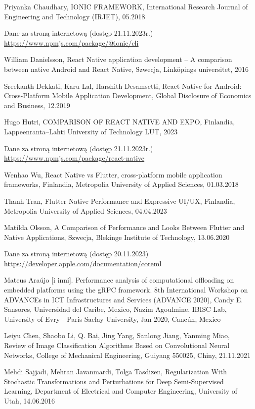 \documentclass[12pt, a4paper, twoside, openany]{book}
\begin{document}
{\begin{enumerate}[label={[}\arabic*{]}]
    \item Priyanka Chaudhary, IONIC FRAMEWORK, International Research Journal of Engineering and Technology (IRJET), 05.2018
    \item Dane za stroną internetową (dostęp 21.11.2023r.) \url{https://www.npmjs.com/package/@ionic/cli}
    \item William Danielsson, React Native application development – A comparison between native Android and React Native, Szwecja, Linköpings universitet, 2016
    \item Sreekanth Dekkati, Karu Lal, Harshith Desamsetti, React Native for Android: Cross-Platform Mobile Application Development, Global Disclosure of Economics and Business, 12.2019
    \item Hugo Hutri, COMPARISON OF REACT NATIVE AND EXPO, Finlandia, Lappeenranta–Lahti University of Technology LUT, 2023
    \item Dane za stroną internetową (dostęp 21.11.2023r.) \url{https://www.npmjs.com/package/react-native}
    \item Wenhao Wu, React Native vs Flutter, cross-platform mobile application frameworks, Finlandia, Metropolia University of Applied Sciences, 01.03.2018
    \item Thanh Tran, Flutter Native Performance and Expressive UI/UX, Finlandia, Metropolia University of Applied Sciences, 04.04.2023
    \item Matilda Olsson, A Comparison of Performance and Looks Between Flutter and Native Applications, Szwecja, Blekinge Institute of Technology, 13.06.2020
    \item Dane za stroną internetową (dostęp 20.11.2023) \url{https://developer.apple.com/documentation/coreml}
    \item Mateus Araújo [i inni]. Performance analysis of computational offloading on embedded platforms using the gRPC framework. 8th International Workshop on ADVANCEs in ICT Infrastructures and Services (ADVANCE 2020), Candy E. Sansores, Universidad del Caribe, Mexico, Nazim Agoulmine, IBISC Lab, University of Evry - Paris-Saclay University, Jan 2020, Cancún, Mexico
    \item Leiyu Chen, Shaobo Li, Q. Bai, Jing Yang, Sanlong Jiang, Yanming Miao, Review of Image Classification Algorithms Based on Convolutional Neural Networks, College of Mechanical Engineering, Guiyang 550025, Chiny, 21.11.2021
    \item Mehdi Sajjadi, Mehran Javanmardi, Tolga Tasdizen, Regularization With Stochastic Transformations and Perturbations for Deep Semi-Supervised Learning, Department of Electrical and Computer Engineering, University of Utah, 14.06.2016

\end{enumerate}}
\end{document}
